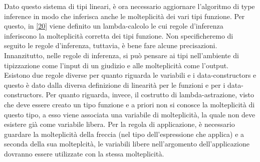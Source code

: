 \documentclass[10pt,a4paper]{article}
\begin{document}
Dato questo sistema di tipi lineari, è ora necessario aggiornare l'algoritmo di type inference in modo che inferisca
anche le molteplicità dei vari tipi funzione. Per questo, in \hyperlink{bibl20}{[20]} viene definito un lambda-calcolo
le cui regole
d'inferenza inferiscono la molteplicità corretta dei tipi funzione. Non specificheremo di seguito le regole d'inferenza,
tuttavia, è bene fare alcune precisazioni. Innanzitutto, nelle regole di inferenza, si può pensare ai tipi nell'ambiente
di tipizzazione come l'input di un giudizio e alle molteplicità come l'output.
Esistono due regole diverse per quanto riguarda le variabili e i data-constructors e questo è dato dalla diversa
definizione di linearità per le funzioni e per i data-constructors. Per quanto riguarda, invece, il costrutto di
lambda-astrazione, visto che deve essere creato un tipo funzione e a priori non si conosce la molteplicità di questo
tipo, a esso viene associata una variabile di molteplicità, la quale non deve esistere già come variabile libera. Per la
regola di applicazione, è necessario guardare la
molteplicità della freccia (nel tipo dell'espressione che applica) e a seconda della sua molteplcità, le variabili libere
nell'argomento dell'applicazione dovranno essere utilizzate con la stessa molteplicità.
\end{document}
